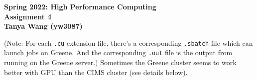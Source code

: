 \documentclass[11pt]{article}
\begin{document}
\begin{center}
\vspace*{-2cm}

\end{center}
\vspace*{.5cm}
\begin{center}
\large \textbf{%
Spring 2022: High Performance Computing}\\
\textbf{ Assignment 4}\\
\large \textbf{%
Tanya Wang (yw3087)}\\
\end{center}


(Note: For each \texttt{.cu} extension file, there's a corresponding \texttt{.sbatch} file which can launch jobs on Greene. And the corresponding \texttt{.out} file is the output from running on the Greene server.) Sometimes the Greene cluster seems to work better with GPU than the CIMS cluster (see details below).
\end{document}
